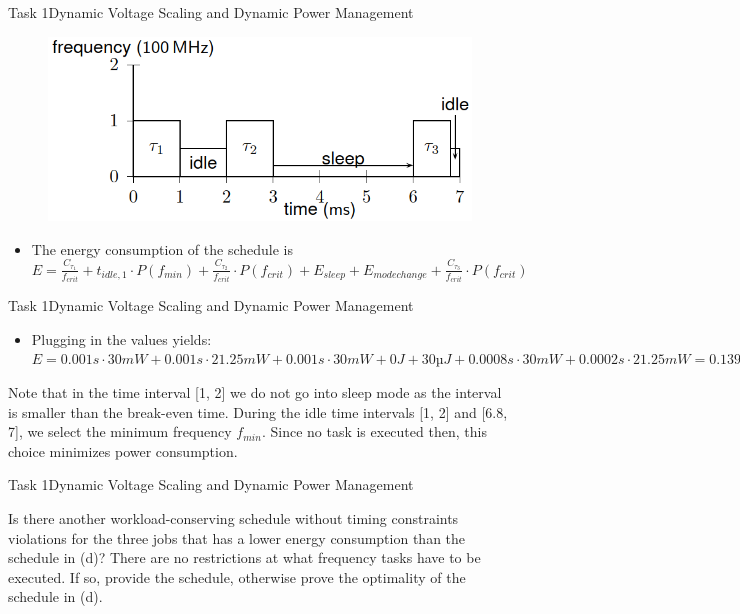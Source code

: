 \begin{frame}{Task 1}{Dynamic Voltage Scaling and Dynamic Power Management}
    \begin{solutionnoinc}
        \begin{figure}
            \centering
            \includegraphics[scale=0.5]{figures/scheduleD).PNG}
        \end{figure}
        \begin{itemize}
            \item The energy consumption of the schedule is $E = \frac{C_{\tau_1}}{f_{crit}} + t_{idle,1} \cdot P(f_{min}) + \frac{C_{\tau_2}}{f_{crit}} \cdot P(f_{crit}) + E_{sleep} + E_{modechange} + \frac{C_{\tau_3}}{f_{crit}} \cdot P(f_{crit})$
        \end{itemize}
    \end{solutionnoinc}
\end{frame}
\begin{frame}{Task 1}{Dynamic Voltage Scaling and Dynamic Power Management}
    \begin{solution}
        \begin{itemize}
            \item Plugging in the values yields: $E = 0.001s \cdot 30mW + 0.001s \cdot 21.25mW + 0.001s \cdot 30mW + 0J + 30µJ + 0.0008s \cdot 30mW + 0.0002s \cdot 21.25mW = 0.1395 mJ$
        \end{itemize}
    \end{solution}
    \begin{Sidenote}
    Note that in the time interval [1, 2] we do not go into sleep mode as the interval is smaller than the break-even time. During the idle time intervals [1, 2] and [6.8, 7], we select the minimum frequency $f_{min}$. Since no task is executed then, this choice minimizes power consumption.
    \end{Sidenote}
\end{frame}
\begin{frame}{Task 1}{Dynamic Voltage Scaling and Dynamic Power Management}
    \begin{tasknoinc}
    Is there another workload-conserving schedule without timing constraints violations for the three jobs
that has a lower energy consumption than the schedule in (d)? There are no restrictions at what
frequency tasks have to be executed. If so, provide the schedule, otherwise prove the optimality of the
schedule in (d).
    \end{tasknoinc}
\end{frame}


